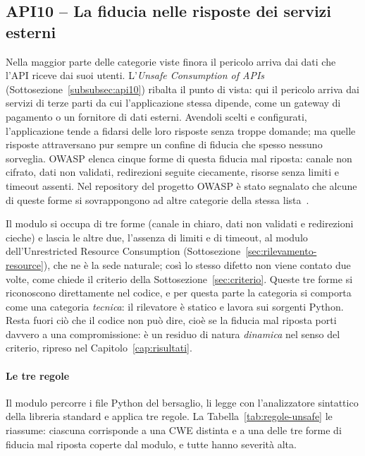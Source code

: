 \subsection{API10 -- La fiducia nelle risposte dei servizi esterni}
\label{sec:rilevamento-unsafe}

Nella maggior parte delle categorie viste finora il pericolo arriva dai dati
che l'API riceve dai suoi utenti.
L'\emph{Unsafe Consumption of APIs}~\cite{owasp2023api10}
(Sottosezione~\ref{subsubsec:api10}) ribalta il punto di vista: qui il pericolo
arriva dai servizi di terze parti da cui l'applicazione stessa dipende, come un
gateway di pagamento o un fornitore di dati esterni. Avendoli scelti e
configurati, l'applicazione tende a fidarsi delle loro risposte senza troppe
domande; ma quelle risposte attraversano pur sempre un confine di
fiducia che spesso nessuno sorveglia. OWASP
elenca cinque forme di questa fiducia mal riposta: canale non cifrato, dati non
validati, redirezioni seguite ciecamente, risorse senza limiti e timeout
assenti. Nel repository del progetto OWASP è stato segnalato che alcune di
queste forme si sovrappongono ad altre categorie della stessa
lista~\cite{owasp2023apiissue80}.

Il modulo si occupa di tre forme (canale in chiaro, dati non validati e
redirezioni cieche) e lascia le altre due, l'assenza
di limiti e di timeout, al modulo dell'Unrestricted Resource Consumption
(Sottosezione~\ref{sec:rilevamento-resource}), che ne è la sede naturale; così lo
stesso difetto non viene contato due volte, come chiede il criterio della
Sottosezione~\ref{sec:criterio}. Queste tre forme si riconoscono direttamente
nel codice, e per questa parte la categoria si comporta come una categoria
\emph{tecnica}: il rilevatore è statico e lavora sui sorgenti Python. Resta
fuori ciò che il codice non può dire, cioè se la fiducia mal riposta porti
davvero a una compromissione: è un residuo di natura \emph{dinamica} nel senso
del criterio, ripreso nel Capitolo~\ref{cap:risultati}.

\paragraph{Le tre regole}
\label{sec:unsafe-rules}

Il modulo percorre i file Python del bersaglio, li legge con l'analizzatore
sintattico della libreria standard e applica tre regole. La
Tabella~\ref{tab:regole-unsafe} le riassume: ciascuna corrisponde a una CWE
distinta e a una delle tre forme di fiducia mal riposta coperte dal modulo, e
tutte hanno severità alta.


